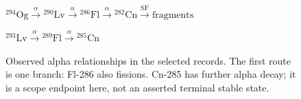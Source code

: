 \begin{figure}[htbp]
\centering
\( {}^{294}\mathrm{Og}\xrightarrow{\alpha}{}^{290}\mathrm{Lv}
\xrightarrow{\alpha}{}^{286}\mathrm{Fl}\xrightarrow{\alpha}{}^{282}\mathrm{Cn}
\xrightarrow{\mathrm{SF}}\text{fragments} \)
\par\smallskip
\( {}^{293}\mathrm{Lv}\xrightarrow{\alpha}{}^{289}\mathrm{Fl}
\xrightarrow{\alpha}{}^{285}\mathrm{Cn} \)
\caption{Observed alpha relationships in the selected records. The first route is one branch: Fl-286 also fissions. Cn-285 has further alpha decay; it is a scope endpoint here, not an asserted terminal stable state.}
\label{fig:isotope-chains}
\end{figure}
